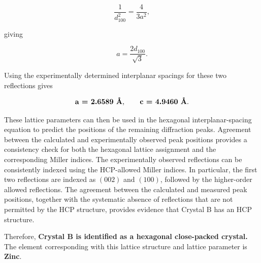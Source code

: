 \documentclass[12pt]{article}
\begin{document}
\begin{equation}
\frac{1}{d_{100}^2} = \frac{4}{3a^2},
\end{equation}

giving

\begin{equation}
a = \frac{2d_{100}}{\sqrt{3}}.
\end{equation}

Using the experimentally determined interplanar spacings for these two reflections gives

\begin{equation}
\textbf{a = 2.6589\ \text{\AA}},
\qquad
\textbf{c = 4.9460\ \text{\AA}}.
\end{equation}

These lattice parameters can then be used in the hexagonal interplanar-spacing equation to predict the positions of the remaining diffraction peaks. 
Agreement between the calculated and experimentally observed peak positions provides a consistency check for both the hexagonal lattice assignment and the corresponding Miller indices. 
The experimentally observed reflections can be consistently indexed using the HCP-allowed Miller indices. In particular, the first two reflections are indexed as $(002)$ and $(100)$, 
followed by the higher-order allowed reflections. 
The agreement between the calculated and measured peak positions, together with the systematic absence of reflections that are not permitted by the HCP structure, provides evidence 
that Crystal B has an HCP structure.

Therefore, \textbf{Crystal B is identified as a hexagonal close-packed crystal.} The element corresponding with this lattice structure and lattice parameter is \textbf{Zinc}.
\end{document}
